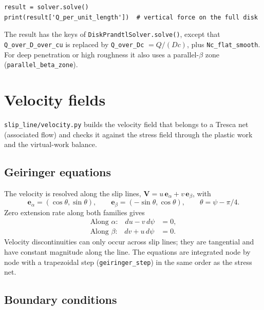 \documentclass[11pt,a4paper]{article}
\begin{document}
\begin{lstlisting}
result = solver.solve()
print(result['Q_per_unit_length'])  # vertical force on the full disk
\end{lstlisting}

The result has the keys of \texttt{DiskPrandtlSolver.solve()}, except
that \texttt{Q\_over\_D\_over\_cu} is replaced by
\texttt{Q\_over\_Dc} $= Q/(Dc)$, plus \texttt{Nc\_flat\_smooth}.
For deep penetration or high roughness it also uses a parallel-$\beta$
zone (\texttt{parallel\_beta\_zone}).

\section{Velocity fields}
\label{sec:velocity}

\texttt{slip\_line/velocity.py} builds the velocity field that belongs
to a Tresca net (associated flow) and checks it against the stress
field through the plastic work and the virtual-work balance.

\subsection{Geiringer equations}

The velocity is resolved along the slip lines,
$\mathbf V = u\,\mathbf e_\alpha + v\,\mathbf e_\beta$, with
\begin{equation}
  \mathbf e_\alpha = (\cos\theta, \sin\theta), \qquad
  \mathbf e_\beta = (-\sin\theta, \cos\theta), \qquad
  \theta = \psi - \pi/4 .
\end{equation}
Zero extension rate along both families gives
\begin{align}
  \text{Along $\alpha$:} \quad du - v\,d\psi &= 0, \\
  \text{Along $\beta$:} \quad dv + u\,d\psi &= 0 .
\end{align}
Velocity discontinuities can only occur across slip lines; they are
tangential and have constant magnitude along the line.  The equations
are integrated node by node with a trapezoidal step
(\texttt{geiringer\_step}) in the same order as the stress net.

\subsection{Boundary conditions}
\end{document}
